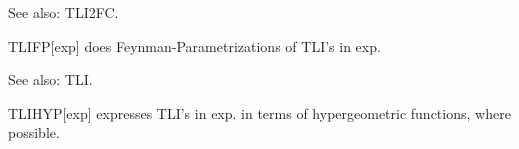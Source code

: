

See also:  TLI2FC.





TLIFP[exp] does Feynman-Parametrizations of TLI's in exp.



See also:  TLI.





TLIHYP[exp] expresses TLI's in exp. in terms of hypergeometric functions, where possible.


